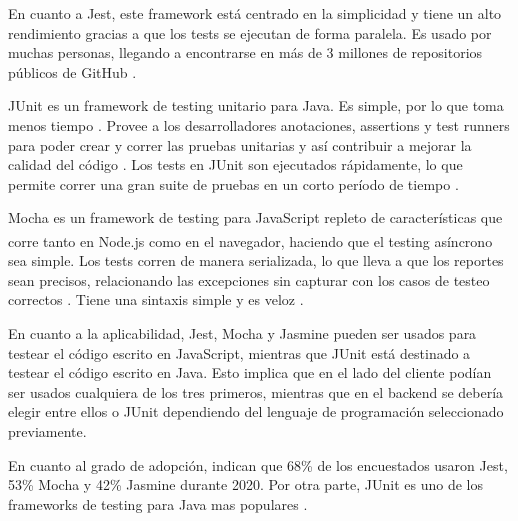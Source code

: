 \documentclass{article}
\begin{document}
En cuanto a Jest, este framework está centrado en la simplicidad y tiene un alto rendimiento gracias a que los tests se ejecutan de forma paralela. Es usado por muchas personas, llegando a encontrarse en más de 3 millones de repositorios públicos de GitHub \parencite{jestOfficial}.

JUnit es un framework de testing unitario para Java. Es simple, por lo que toma menos tiempo \parencite{tutorialsPointJUnit}. Provee a los desarrolladores anotaciones, assertions y test runners para poder crear y correr las pruebas unitarias y así contribuir a mejorar la calidad del código \parencite{simplilearnJUnit}. Los tests en JUnit son ejecutados rápidamente, lo que permite correr una gran suite de pruebas en un corto período de tiempo \parencite{codeIntelligenceJUnit}.

Mocha es un framework de testing para JavaScript repleto de características que corre tanto en Node.js\textsuperscript{\textregistered} como en el navegador, haciendo que el testing asíncrono sea simple. Los tests corren de manera serializada, lo que lleva a que los reportes sean precisos, relacionando las excepciones sin capturar con los casos de testeo correctos \parencite{mochaHome}. Tiene una sintaxis simple y es veloz \parencite{mindkTesting}.

En cuanto a la aplicabilidad, Jest, Mocha y Jasmine pueden ser usados para testear el código escrito en JavaScript, mientras que JUnit está destinado a testear el código escrito en Java. Esto implica que en el lado del cliente podían ser usados cualquiera de los tres primeros, mientras que en el backend se debería elegir entre ellos o JUnit dependiendo del lenguaje de programación seleccionado previamente.

En cuanto al grado de adopción, \textcite{stateofjsTesting} indican que 68\% de los encuestados usaron Jest, 53\% Mocha y 42\% Jasmine durante 2020. Por otra parte, JUnit es uno de los frameworks de testing para Java mas populares \parencite{headspinJUnit}.
\end{document}

